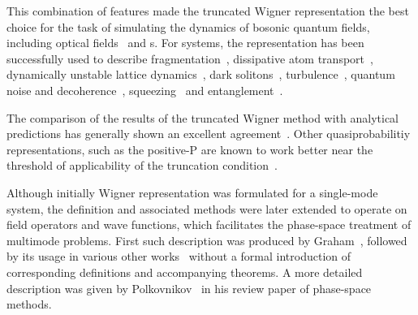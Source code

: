 This combination of features made the truncated Wigner representation the best choice for the task of simulating the dynamics of bosonic quantum fields, including optical fields~\cite{Drummond1993,Drummond1993a,Corney2006,Corney2008} and s.
For  systems, the representation has been successfully used to describe fragmentation~\cite{Isella2005,Isella2006,Gross2011}, dissipative atom transport~\cite{Ruostekoski2005}, dynamically unstable lattice dynamics~\cite{Shrestha2009}, dark solitons~\cite{Martin2010,Martin2010a}, turbulence~\cite{Norrie2005,Norrie2006}, quantum noise and decoherence~\cite{Steel1998,Norrie2006a,Egorov2011}, squeezing~\cite{Opanchuk2012} and entanglement~\cite{Opanchuk2012a}.

The comparison of the results of the truncated Wigner method with analytical predictions has generally shown an excellent agreement~\cite{Corney2006,Deuar2007}.
Other quasiprobabilitiy representations, such as the positive-P are known to work better near the threshold of applicability of the truncation condition~\cite{Deuar2007,Hoffmann2008}.

Although initially Wigner representation was formulated for a single-mode system, the definition and associated methods were later extended to operate on field operators and wave functions,
which facilitates the phase-space treatment of multimode problems.
First such description was produced by Graham~\cite{Graham1970,Graham1970a}, followed by its usage in various other works~\cite{Steel1998,Gardiner2003,Isella2006,Norrie2006,Norrie2006a,Blakie2008,Martin2010} without a formal introduction of corresponding definitions and accompanying theorems.
A more detailed description was given by Polkovnikov~\cite{Polkovnikov2010} in his review paper of phase-space methods.

